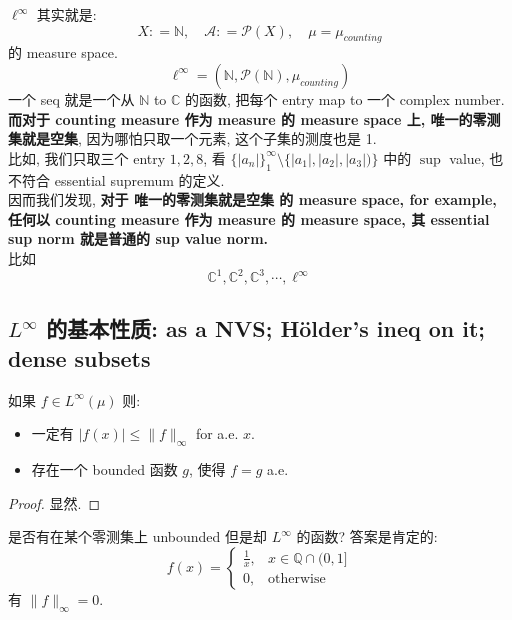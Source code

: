 \documentclass[lang=cn,11pt]{elegantbook}
\begin{document}
\begin{remark}
$\ell^\infty$ 其实就是: \[
X: = \mathbb{N},\quad \mathcal{A}: = \mathcal{P}(X),\quad \mu = \mu_{counting}
\]的 measure space. \[
\ell^\infty = (\mathbb{N}, \mathcal{P}(\mathbb{N}), \mu_{counting} )
\]
一个 seq 就是一个从 $\mathbb{N}$ to $\mathbb{C}$ 的函数, 把每个 entry map to 一个 complex number.\\
\textbf{而对于 counting measure 作为 measure 的 measure space 上, 唯一的零测集就是空集}, 因为哪怕只取一个元素, 这个子集的测度也是 1.\\
比如, 我们只取三个 entry $1,2,8$, 看 $\{|a_n|\}_1^\infty \setminus \{|a_1|,|a_2|, |a_3|)\}$ 中的 $\sup$ value, 也不符合 essential supremum 的定义.\\
因而我们发现, \textbf{对于 唯一的零测集就是空集 的 measure space, for example, 任何以 counting measure 作为 measure 的 measure space, 其 essential sup norm 就是普通的 sup value norm.}\\
比如 \[
\mathbb{C}^1,\mathbb{C}^2,\mathbb{C}^3,\cdots,\ell^\infty
\]
\end{remark}

\subsection{$L^\infty$ 的基本性质: as a NVS; Hölder's ineq on it; dense subsets }

\begin{lemma}
如果 $f \in L^\infty(\mu) $ 则: 
\begin{itemize}
    \item 一定有 $|f(x)| \leq \|f\|_\infty$ for a.e. $x$.
    \item 存在一个 bounded 函数 $g$, 使得 $f=g$ a.e.
\end{itemize}
\end{lemma}
\begin{proof}
    显然.
\end{proof}
\begin{remark}
    是否有在某个零测集上 unbounded 但是却 $L^\infty$ 的函数? 答案是肯定的:\[
f(x) =
\begin{cases}
\frac{1}{x}, & x \in \mathbb{Q} \cap (0,1] \\
0, & \text{otherwise}
\end{cases}
\]
有 $\|f\|_\infty = 0$.
\end{remark}
\end{document}
